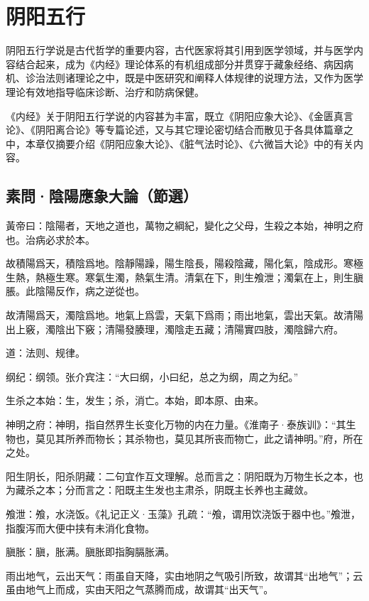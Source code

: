 \documentclass[12pt]{ctexbook}
\begin{document}
\pagestyle{main2}
\fi
\chapter{阴阳五行}%

阴阳五行学说是古代哲学的重要内容，古代医家将其引用到医学领域，并与医学内容结合起来，成为《内经》理论体系的有机组成部分并贯穿于藏象经络、病因病机、诊治法则诸理论之中，既是中医研究和阐释人体规律的说理方法，又作为医学理论有效地指导临床诊断、治疗和防病保健。

《内经》关于阴阳五行学说的内容甚为丰富，既立《阴阳应象大论》、《金匮真言论》、《阴阳离合论》等专篇论述，又与其它理论密切结合而散见于各具体篇章之中，本章仅摘要介绍《阴阳应象大论》、《脏气法时论》、《六微旨大论》中的有关内容。

\section{素問·陰陽應象大論（節選）}%


\begin{yuanwen}%
黃帝曰：陰陽者，天地之道也，萬物之綱紀，變化之父母，生殺之本始，神明之府也。治病必求於本。

故積陽爲天，積陰爲地。陰靜陽躁，陽生陰長，陽殺陰藏，陽化氣，陰成形。寒極生熱，熱極生寒。寒氣生濁，熱氣生清。清氣在下，則生飧泄；濁氣在上，則生䐜脹。此陰陽反作，病之逆從也。

故清陽爲天，濁陰爲地。地氣上爲雲，天氣下爲雨；雨出地氣，雲出天氣。故清陽出上竅，濁陰出下竅；清陽發腠理，濁陰走五藏；清陽實四肢，濁陰歸六府。
\end{yuanwen}


\begin{jiaozhu}
  \item 道：法则、规律。
  \item 纲纪：纲领。张介宾注：“大曰纲，小曰纪，总之为纲，周之为纪。”
  \item 生杀之本始：生，发生；杀，消亡。本始，即本原、由来。
  \item 神明之府：神明，指自然界生长变化万物的内在力量。《淮南子·泰族训》：“其生物也，莫见其所养而物长；其杀物也，莫见其所丧而物亡，此之请神明。”府，所在之处。
  \item 阳生阴长，阳杀阴藏：二句宜作互文理解。总而言之：阴阳既为万物生长之本，也为藏杀之本；分而言之：阳既主生发也主肃杀，阴既主长养也主藏敛。
  \item 飧泄：飧，水浇饭。《礼记正义·玉藻》孔疏：“飧，谓用饮浇饭于器中也。”飧泄，指腹泻而大便中挟有未消化食物。
  \item 䐜胀：䐜，胀满。䐜胀即指胸膈胀满。
  \item 雨出地气，云出天气：雨虽自天降，实由地阴之气吸引所致，故谓其“出地气”；云虽由地气上而成，实由天阳之气蒸腾而成，故谓其“出天气”。
\end{jiaozhu}
\end{document}
